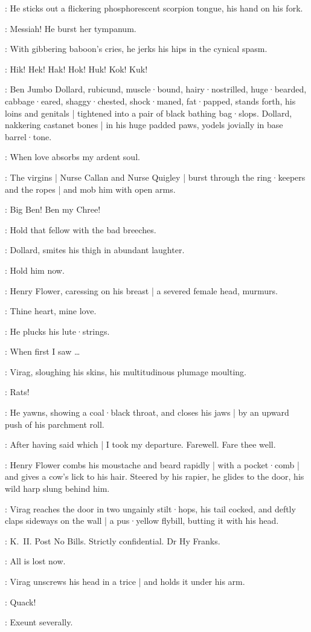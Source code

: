 :
He sticks out a flickering phosphorescent scorpion tongue,
his hand on his fork.

\Virag:
Messiah!
He burst her tympanum.

:
With gibbering baboon's cries,
he jerks his hips in the cynical spasm.

\Virag:
Hik!
Hek!
Hak!
Hok!
Huk!
Kok!
Kuk!

:
Ben Jumbo Dollard,
rubicund,
muscle·bound,
hairy·nostrilled,
huge·bearded,
cabbage·eared,
shaggy·chested,
shock·maned,
fat·papped,
stands forth,
his loins and genitals |
tightened into a pair of black bathing bag·slops.
Dollard,
nakkering castanet bones |
in his huge padded paws,
yodels jovially in base barrel·tone.

\BenDollard:
When love absorbs my ardent soul.

:
The virgins |
Nurse Callan and Nurse Quigley |
burst through the ring·keepers and the ropes |
and mob him with open arms.

\Virgins:
Big Ben!
Ben my Chree!

\Voice:
Hold that fellow with the bad breeches.

:
Dollard,
smites his thigh in abundant laughter.

\BenDollard:
Hold him now.

:
Henry Flower,
caressing on his breast |
a severed female head,
murmurs.

\Henry:
Thine heart,
mine love.

:
He plucks his lute·strings.

\Henry:
When first I saw \ldots

:
Virag,
sloughing his skins,
his multitudinous plumage moulting.

\Virag:
Rats!

:
He yawns,
showing a coal·black throat,
and closes his jaws |
by an upward push of his parchment roll.

\Virag:
After having said which |
I took my departure.
Farewell.
Fare thee well.

:
Henry Flower combs his moustache and beard rapidly |
with a pocket·comb |
and gives a cow's lick to his hair.
Steered by his rapier,
he glides to the door,
his wild harp slung behind him.

:
Virag reaches the door in two ungainly stilt·hops,
his tail cocked,
and deftly claps sideways on the wall |
a pus·yellow flybill,
butting it with his head.

\Flybill[2]:
K.~II.
Post No Bills.
Strictly confidential.
Dr Hy Franks.

\Henry:
All is lost now.

:
Virag unscrews his head in a trice |
and holds it under his arm.

\ViragsHead:
Quack!

\All:
Exeunt severally.
